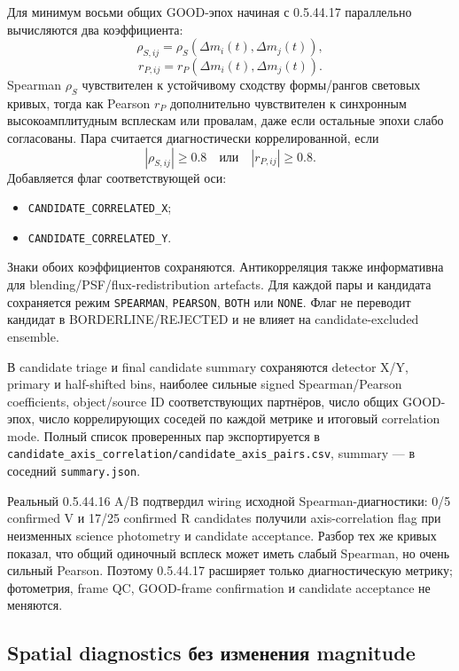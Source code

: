 Для минимум восьми общих GOOD-эпох начиная с 0.5.44.17 параллельно вычисляются два коэффициента:
\begin{equation}
 \rho_{S,ij}=\rho_S\left(\Delta m_i(t),\Delta m_j(t)\right),
\end{equation}
\begin{equation}
 r_{P,ij}=r_P\left(\Delta m_i(t),\Delta m_j(t)\right).
\end{equation}
Spearman $\rho_S$ чувствителен к устойчивому сходству формы/рангов световых кривых, тогда как Pearson
$r_P$ дополнительно чувствителен к синхронным высокоамплитудным всплескам или провалам, даже если остальные
эпохи слабо согласованы. Пара считается диагностически коррелированной, если
\begin{equation}
 |\rho_{S,ij}|\ge0.8 \quad \text{или} \quad |r_{P,ij}|\ge0.8.
\end{equation}
Добавляется флаг соответствующей оси:
\begin{itemize}
  \item \texttt{CANDIDATE\_CORRELATED\_X};
  \item \texttt{CANDIDATE\_CORRELATED\_Y}.
\end{itemize}
Знаки обоих коэффициентов сохраняются. Антикорреляция также информативна для
blending/PSF/flux-redistribution artefacts. Для каждой пары и кандидата сохраняется режим
\texttt{SPEARMAN}, \texttt{PEARSON}, \texttt{BOTH} или \texttt{NONE}. Флаг не переводит кандидат в
BORDERLINE/REJECTED и не влияет на candidate-excluded ensemble.

В candidate triage и final candidate summary сохраняются detector X/Y, primary и half-shifted bins,
наиболее сильные signed Spearman/Pearson coefficients, object/source ID соответствующих партнёров,
число общих GOOD-эпох, число коррелирующих соседей по каждой метрике и итоговый correlation mode.
Полный список проверенных пар экспортируется в
\texttt{candidate\_axis\_correlation/candidate\_axis\_pairs.csv}, summary --- в соседний
\texttt{summary.json}.

Реальный 0.5.44.16 A/B подтвердил wiring исходной Spearman-диагностики: 0/5 confirmed V и 17/25
confirmed R candidates получили axis-correlation flag при неизменных science photometry и candidate
acceptance. Разбор тех же кривых показал, что общий одиночный всплеск может иметь слабый Spearman, но
очень сильный Pearson. Поэтому 0.5.44.17 расширяет только диагностическую метрику; фотометрия, frame QC,
GOOD-frame confirmation и candidate acceptance не меняются.

\subsection{Spatial diagnostics без изменения magnitude}

